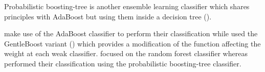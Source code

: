 \begin{enumerate}[leftmargin=*]
Probabilistic boosting-tree is another ensemble learning classifier which shares principles with AdaBoost but using them inside a decision tree (\cite{Tu2005}). %
%
%
%
%

\cite{Lopes2011} make use of the AdaBoost classifier to perform their classification while \cite{Litjens2014} used the GentleBoost variant (\cite{Friedman1998}) which provides a modification of the function affecting the weight at each weak classifier. \cite{Kelm2007,Litjens2014,Tiwari2012,Tiwari2013,Viswanath2009} focused on the random forest classifier whereas \cite{Tiwari2009a,Tiwari2012,Tiwari2010,Viswanath2011} performed their classification using the probabilistic boosting-tree classifier.


\end{enumerate}
